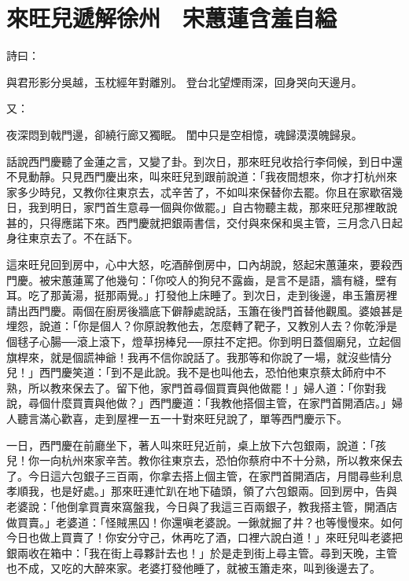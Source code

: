 %

\chapter{來旺兒遞解徐州　宋蕙蓮含羞自縊}

詩曰：

與君形影分吳越，玉枕經年對離別。
登台北望煙雨深，回身哭向天邊月。

又：

夜深悶到戟門邊，卻繞行廊又獨眠。
閨中只是空相憶，魂歸漠漠魄歸泉。

話說西門慶聽了金蓮之言，又變了卦。到次日，那來旺兒收拾行李伺候，到日中還不見動靜。只見西門慶出來，叫來旺兒到跟前說道：「我夜間想來，你才打杭州來家多少時兒，又教你往東京去，忒辛苦了，不如叫來保替你去罷。你且在家歇宿幾日，我到明日，家門首生意尋一個與你做罷。」自古物聽主裁，那來旺兒那裡敢說甚的，只得應諾下來。西門慶就把銀兩書信，交付與來保和吳主管，三月念八日起身往東京去了。不在話下。

這來旺兒回到房中，心中大怒，吃酒醉倒房中，口內胡說，怒起宋蕙蓮來，要殺西門慶。被宋蕙蓮罵了他幾句：「你咬人的狗兒不露齒，是言不是語，牆有縫，壁有耳。吃了那黃湯，挺那兩覺。」打發他上床睡了。到次日，走到後邊，串玉簫房裡請出西門慶。兩個在廚房後牆底下僻靜處說話，玉簫在後門首替他觀風。婆娘甚是埋怨，說道：「你是個人？你原說教他去，怎麼轉了靶子，又教別人去？你乾淨是個毬子心腸──滾上滾下，燈草拐棒兒──原拄不定把。你到明日蓋個廟兒，立起個旗桿來，就是個謊神爺！我再不信你說話了。我那等和你說了一場，就沒些情分兒！」西門慶笑道：「到不是此說。我不是也叫他去，恐怕他東京蔡太師府中不熟，所以教來保去了。留下他，家門首尋個買賣與他做罷！」婦人道：「你對我說，尋個什麼買賣與他做？」西門慶道：「我教他搭個主管，在家門首開酒店。」婦人聽言滿心歡喜，走到屋裡一五一十對來旺兒說了，單等西門慶示下。

一日，西門慶在前廳坐下，著人叫來旺兒近前，桌上放下六包銀兩，說道：「孩兒！你一向杭州來家辛苦。教你往東京去，恐怕你蔡府中不十分熟，所以教來保去了。今日這六包銀子三百兩，你拿去搭上個主管，在家門首開酒店，月間尋些利息孝順我，也是好處。」那來旺連忙趴在地下磕頭，領了六包銀兩。回到房中，告與老婆說：「他倒拿買賣來窩盤我，今日與了我這三百兩銀子，教我搭主管，開酒店做買賣。」老婆道：「怪賊黑囚！你還嗔老婆說。一鍬就掘了井？也等慢慢來。如何今日也做上買賣了！你安分守己，休再吃了酒，口裡六說白道！」來旺兒叫老婆把銀兩收在箱中：「我在街上尋夥計去也！」於是走到街上尋主管。尋到天晚，主管也不成，又吃的大醉來家。老婆打發他睡了，就被玉簫走來，叫到後邊去了。

